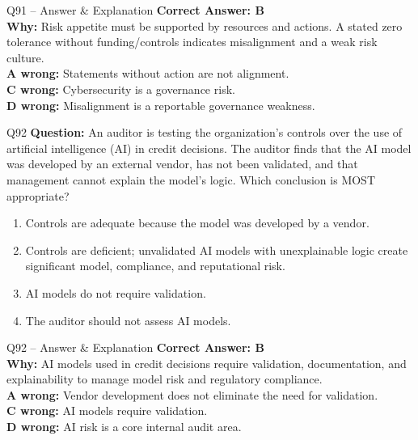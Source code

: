 \documentclass[aspectratio=169,10pt]{beamer}
\begin{document}
	\begin{frame}[t]{Q91 -- Answer \& Explanation}
		\small
		\textbf{Correct Answer: B} \\[4pt]
		\textbf{Why:} Risk appetite must be supported by resources and actions. A stated zero tolerance without funding/controls indicates misalignment and a weak risk culture. \\[4pt]
		\textbf{A wrong:} Statements without action are not alignment. \\[2pt]
		\textbf{C wrong:} Cybersecurity is a governance risk. \\[2pt]
		\textbf{D wrong:} Misalignment is a reportable governance weakness.
	\end{frame}
	
	\begin{frame}[t]{Q92}
		\small
		\textbf{Question:} An auditor is testing the organization's controls over the use of artificial intelligence (AI) in credit decisions. The auditor finds that the AI model was developed by an external vendor, has not been validated, and that management cannot explain the model's logic. Which conclusion is MOST appropriate?
		\begin{enumerate}[label=\Alph*.,itemsep=1pt,topsep=2pt]
			\item Controls are adequate because the model was developed by a vendor.
			\item Controls are deficient; unvalidated AI models with unexplainable logic create significant model, compliance, and reputational risk.
			\item AI models do not require validation.
			\item The auditor should not assess AI models.
		\end{enumerate}
	\end{frame}
	
	\begin{frame}[t]{Q92 -- Answer \& Explanation}
		\small
		\textbf{Correct Answer: B} \\[4pt]
		\textbf{Why:} AI models used in credit decisions require validation, documentation, and explainability to manage model risk and regulatory compliance. \\[4pt]
		\textbf{A wrong:} Vendor development does not eliminate the need for validation. \\[2pt]
		\textbf{C wrong:} AI models require validation. \\[2pt]
		\textbf{D wrong:} AI risk is a core internal audit area.
	\end{frame}
	
\end{document}
